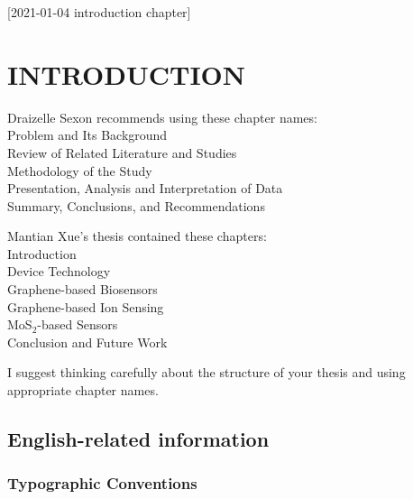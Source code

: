 [2021-01-04 introduction chapter]

\chapter{INTRODUCTION}

Draizelle Sexon \cite{sexon2012} recommends using these chapter names:\\
 Problem and Its Background\\
 Review of Related Literature and Studies\\
 Methodology of the Study\\
 Presentation, Analysis and Interpretation of Data\\
 Summary, Conclusions, and Recommendations

Mantian Xue's \cite{xue2019} thesis contained these chapters:\\
 Introduction\\
 Device Technology\\
 Graphene-based Biosensors\\
 Graphene-based Ion Sensing\\
 MoS${}_2$-based Sensors\\
 Conclusion and Future Work

I suggest thinking carefully about the structure of your thesis
and using appropriate chapter names.


\section{English-related information}


\subsection{Typographic Conventions}

